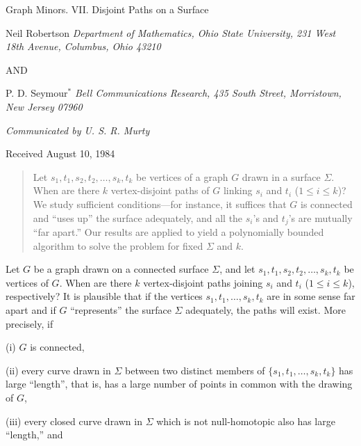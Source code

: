 {\centering
{\Large Graph Minors. VII. Disjoint Paths on a Surface\par}\medskip

Neil Robertson \textit{Department of Mathematics, Ohio State University, 231 West 18th Avenue, Columbus, Ohio 43210}\par
AND\par
P. D. Seymour$^*$ \textit{Bell Communications Research, 435 South Street, Morristown, New Jersey 07960}\par
\textit{Communicated by U. S. R. Murty}\par
Received August 10, 1984\par
}
\begin{quote}
Let $s_1, t_1, s_2, t_2, \dots, s_k, t_k$ be vertices of a graph $G$ drawn in a surface $\Sigma$. When are there $k$ vertex-disjoint paths of $G$ linking $s_i$ and $t_i$ ($1 \le i \le k$)? We study sufficient conditions---for instance, it suffices that $G$ is connected and ``uses up'' the surface adequately, and all the $s_i$'s and $t_j$'s are mutually ``far apart.'' Our results are applied to yield a polynomially bounded algorithm to solve the problem for fixed $\Sigma$ and $k$.

\end{quote}


Let $G$ be a graph drawn on a connected surface $\Sigma$, and let $s_1, t_1, s_2, t_2, \dots, s_k, t_k$ be vertices of $G$. When are there $k$ vertex-disjoint paths joining $s_i$ and $t_i$ ($1 \le i \le k$), respectively? It is plausible that if the vertices $s_1, t_1, \dots, s_k, t_k$ are in some sense far apart and if $G$ ``represents'' the surface $\Sigma$ adequately, the paths will exist. More precisely, if

\hspace*{12pt}(i) $G$ is connected,

\hspace*{12pt}(ii) every curve drawn in $\Sigma$ between two distinct members of $\{s_1, t_1, \dots, s_k, t_k\}$ has large ``length'', that is, has a large number of points in common with the drawing of $G$,

\hspace*{12pt}(iii) every closed curve drawn in $\Sigma$ which is not null-homotopic also has large ``length,'' and%
